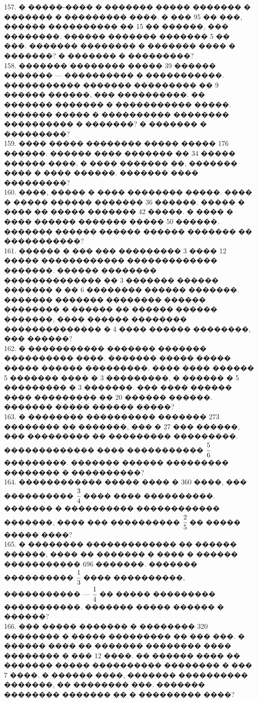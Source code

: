 \documentclass[12pt]{article}
\begin{document}
157. � �����-���� � ������� ����� ������� � ������� � ��������� ����. � ��� 95 �� ���, ������ ���������� �� 15 �� ������, ��� ��������. ������ ������� ������� 5 �� ���. ������� �������� � ������� ���� � �������? � ������� � ���������?\\
158. ������� �������� ����� 39 ������ ������� --- ���������� � �����������. ����������� ������� ��������� �� 9 ������ ������, ��� ����������. �� ������� ������� � ����������� �����. ������� ����� � ���������� �������� ���������� � �������? � ������� � ���������?\\
159. ���� ����� �������� ����� ����� 176 ������. ������ ���� ������� �� 34 ����� ������ ����, � ���� ������� ��, ������� ���� � ���� ������. ������� ���� ���������?\\
160. ����, ����� � ���� �������� �����. ���� � ����� ������ ������� 36 ������. ����� � ���� �� ����� ������� 42 �����. � ���� � ���� ������ ������� ����� 50 ������. ������� ������ ������ ������ ������� �� �����������?\\
161. ������ � ��� ��� ��������� 3 ���� 12 ����� ������������ ������������� �������. ������ �������� �������������� �� 3 ������� ������ ������� � �� 6 �������� ������ �������. ������� ������� �������� ������ �������� � ������ �� ������ ������ �������, ���� ������ �������� �������������� � 4 ���� ������ ��������, ��� ������?\\
162. � ����������� ������� ������� ���������� ����. ������� ����� ����� ����� ������ ���������. ���� ���� ������ 5 ������� ���� � 3 ���������, � ������ � 5 ��������� � 3 �������. ��� ���� ������ ���� ��������� �� 20 ������ ������. ������� ����� ������ �����?\\
163. � �������� ���������� ������� 273 �������� �� �������, ��� � 27 ��� ������, ��� ��������� �� ��������� ���������. ������������� ���� ����������� $\cfrac{5}{6}$  ���������. ������� ������ ��������� �������� � ����������?\\
164. ������������ ����� ���� � 360 ����, ��� ���������� $\cfrac{3}{4}$ ���� ���� ����������. ������� � ���������� ������������ �������, ���� ��� ���������� $\cfrac{2}{5}$ �� ����� ����� ����?\\
165. � �������� ������������� �� ������ ������, ���� �� ������� � ���� � ������ ����������� 696 �������. ������� ���������� $\cfrac{1}{3}$ ���� ����������, ����������� --- $\cfrac{1}{4}$ �� ����� ��������� �����������. ������� ����� ������ � ������?\\
166. ��� ����� ������� � �������� 320 �������� � ����� ��������� �� ��� ���. � ������ ���� �� ������� �������� ���� �������� � ��� 12 ����. �� ������ ���� �� ������� ����� ���������� �������� � ��� 7 ����. � ������ ����, ������� ���������� �������, �� �������� ���. ������� �������� ������� �� � ��������� ����?\\
\end{document}
